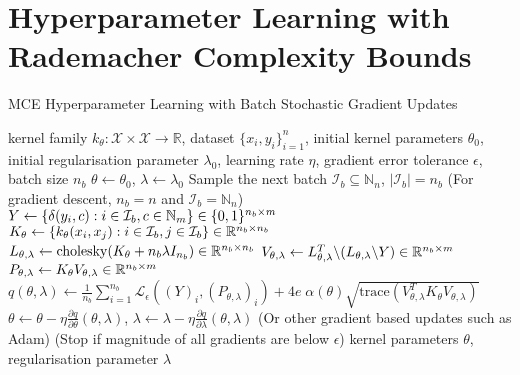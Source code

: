 \documentclass[twoside]{article}
\begin{document}
	\section{Hyperparameter Learning with Rademacher Complexity Bounds}
	\label{sec:hyperparameter_learning}
	
		\begin{algorithm*}[tb]
			\caption{\gls{MCE} Hyperparameter Learning with Batch Stochastic Gradient Updates}
			\label{alg:multiclass_conditional_embedding_training}
			\begin{algorithmic}[1]
				 kernel family $k_{\theta} : \mathcal{X} \times \mathcal{X} \to \mathbb{R}$, dataset $\{x_{i}, y_{i}\}_{i = 1}^{n}$, initial kernel parameters $\theta_{0}$, initial regularisation parameter $\lambda_{0}$, learning rate $\eta$, gradient error tolerance $\epsilon$, batch size $n_{b}$
				\STATE $\theta \leftarrow \theta_{0}$, $\lambda \leftarrow \lambda_{0}$
				\REPEAT
				\STATE Sample the next batch $\mathcal{I}_{b} \subseteq \mathbb{N}_{n}$, $| \mathcal{I}_{b} | = n_{b}$ \hspace{\fill} (For gradient descent, $n_{b} = n$ and $\mathcal{I}_{b} = \mathbb{N}_{n}$)
				\STATE $Y \leftarrow \{\delta(y_{i}, c) : i \in \mathcal{I}_{b}, c \in \mathbb{N}_{m}\} \hspace{\fill} \in \{0, 1\}^{n_{b} \times m}$
				\STATE $K_{\theta} \leftarrow \{k_{\theta}(x_{i}, x_{j}) : i \in \mathcal{I}_{b}, j \in \mathcal{I}_{b}\} \hspace{\fill} \in \mathbb{R}^{n_{b} \times n_{b}}$
				\STATE $L_{\theta, \lambda} \leftarrow \mathrm{cholesky}(K_{\theta} + n_{b} \lambda I_{n_{b}}) \hspace{\fill} \in \mathbb{R}^{n_{b} \times n_{b}}$
				\STATE $V_{\theta, \lambda} \leftarrow L_{\theta, \lambda}^{T} \backslash (L_{\theta, \lambda} \backslash Y) \hspace{\fill} \in \mathbb{R}^{n_{b} \times m}$
				\STATE $P_{\theta, \lambda} \leftarrow K_{\theta} V_{\theta, \lambda} \hspace{\fill} \in \mathbb{R}^{n_{b} \times m}$
				\STATE $q(\theta, \lambda) \leftarrow \frac{1}{n_{b}} \sum_{i = 1}^{n_{b}} \mathcal{L}_{\epsilon}((Y)_{i}, (P_{\theta, \lambda})_{i}) + 4 e \; \alpha(\theta) \sqrt{\mathrm{trace}(V_{\theta, \lambda}^{T} K_{\theta} V_{\theta, \lambda})}$
				\STATE $\theta \leftarrow \theta - \eta \frac{\partial q}{\partial \theta}(\theta, \lambda)$, $\lambda \leftarrow \lambda - \eta \frac{\partial q}{\partial \lambda}(\theta, \lambda)$ \hspace{\fill} (Or other gradient based updates such as Adam)
				 \hspace{\fill} (Stop if magnitude of all gradients are below $\epsilon$)
				 kernel parameters $\theta$, regularisation parameter $\lambda$
			\end{algorithmic}
		\end{algorithm*}
			
\end{document}
